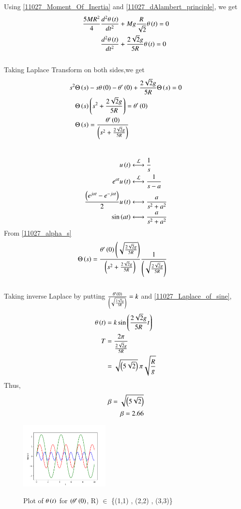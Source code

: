 \documentclass[journal,12pt,twocolumn]{IEEEtran}
\theoremstyle{remark}
\begin{document}
Using \eqref{11027_Moment_Of_Inertia} and \eqref{11027_dAlambert_principle}, we get
\begin{align}
	\frac{5MR^2}{4}&\frac{d^2 \theta \left(t\right)}{dt^2} + Mg\frac{R}{\sqrt{2}} \theta \left(t\right) = 0\\
	&\frac{d^2 \theta \left(t\right)}{dt^2} + \frac{2\sqrt{2}g}{5R} \theta \left(t\right)= 0 	
\end{align}
\\
Taking Laplace Transform on both sides,we get
\begin{align}
	s^2\Theta \left(s\right) &- s \theta \left(0\right) - \theta ' \left(0\right) + \frac{2\sqrt{2}g}{5R} \Theta\left(s\right)= 0\\
	\Theta\left(s\right)&\left(s^2+\frac{2\sqrt{2}g}{5R}\right) = \theta ' \left(0\right)\\
	\Theta\left(s\right)&= \frac{\theta ' \left(0\right)}{\left(s^2 + \frac{2\sqrt{2}g}{5R}\right)} \label{11027_alpha_s}
\end{align}
\\
\begin{align}
	u\brak{t}&\system{L}\frac{1}{s}\\
	e^{at}u\brak{t}&\system{L}\frac{1}{s-a}\\
	\frac{\brak{e^{jat} - e^{-jat}}}{2}u\brak{t}&\system \frac{a}{s^2+a^2}\\
	\sin\brak{at}&\system\frac{a}{s^2+a^2} \label{11027_Laplace_of_sine}
\end{align}
From \eqref{11027_alpha_s}
\begin{align}
	\Theta\left(s\right)&= \frac{\theta ' \left(0\right) \left(\sqrt{\frac{2\sqrt{2}g}{5R} }\right) }{\left(s^2 + \frac{2\sqrt{2}g}{5R}\right)} \frac{1}{ \left(\sqrt{\frac{2\sqrt{2}g}{5R} }\right) }
\end{align}
\\
Taking inverse Laplace by putting $\frac{\theta ' \left(0\right)}{\left(\sqrt{\frac{2\sqrt{2}g}{5R}}\right)} = k$ and \eqref{11027_Laplace_of_sine}, 
\begin{align}
	\theta \left(t\right) &= k \sin\left(\frac{2\sqrt{2}g}{5R} t\right)\\
	T &= \frac{2 \pi}{\frac{2\sqrt{2}g}{5R}}\\
	&= \sqrt{\left(5\sqrt{2}\right)}\:\pi \sqrt{\frac{R}{g}}
\end{align}
Thus, 
\begin{align}
	\beta = \sqrt{\left(5\sqrt{2}\right)}\\
	\beta = 2.66
\end{align}
\begin{figure}[h]
    \includegraphics[width=0.4\textwidth]{figs/theta_t_plot.png}\label{11027_GATE_ME_32_thetaplot}
    \caption{Plot of $\theta\left(t\right)$ for $(\theta'\left(0\right)$, R) $\in$ \{(1,1) , (2,2) , (3,3)\}}
\end{figure}
\end{document}
